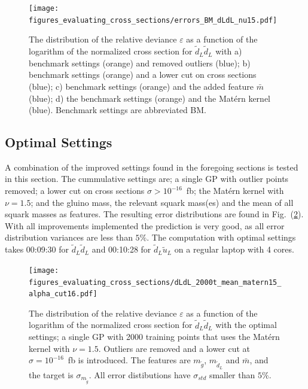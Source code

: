 \documentclass[twoside,english]{uiofysmaster}
\begin{document}
\begin{figure}
\texttt{[image: figures\_evaluating\_cross\_sections/errors\_BM\_dLdL\_nu15.pdf]}
\caption{The distribution of the relative deviance $\varepsilon$ as a function of the logarithm of the normalized cross section for $\tilde{d}_L \tilde{d}_L$ with a) benchmark settings (orange) and removed outliers (blue); b) benchmark settings (orange) and a lower cut on cross sections (blue); c) benchmark settings (orange) and the added feature $\bar{m}$ (blue); d) the benchmark settings (orange) and the Mat\'{e}rn kernel (blue). Benchmark settings are abbreviated BM.}
\label{Fig:: evaluating cross : errors BM dLdL}
\end{figure}


\subsection{Optimal Settings}

A combination of the improved settings found in the foregoing sections is tested in this section. The cummulative settings are; a single GP with outlier points removed; a lower cut on cross sections $\sigma > 10^{-16}$~fb; the Mat\'{e}rn kernel with $\nu=1.5$; and the gluino mass, the relevant squark mass(es) and the mean of all squark masses as features. The resulting error distributions are found in Fig.~(\ref{Fig:: evaluating cross : error distribution dLdL optimal}). With all improvements implemented the prediction is very good, as all error distribution variances are less than $5\%$. The computation with optimal settings takes 00:09:30 for $\tilde{d}_L \tilde{d}_L$ and 00:10:28 for $\tilde{d}_L \tilde{u}_L$ on a regular laptop with 4 cores. 

\begin{figure}
\centering
\texttt{[image: figures\_evaluating\_cross\_sections/dLdL\_2000t\_mean\_matern15\_alpha\_cut16.pdf]}
\caption{The distribution of the relative deviance $\varepsilon$ as a function of the logarithm of the normalized cross section for $\tilde{d}_L \tilde{d}_L$ with the optimal settings; a single GP with 2000 training points that uses the Mat\'{e}rn kernel with $\nu=1.5$. Outliers are removed and a lower cut at $\sigma=10^{-16}$~fb is introduced. The features are $m_{\tilde{g}}$, $m_{\tilde{d}_L}$ and $\bar{m}$, and the target is $\sigma_{m_{\tilde{g}}}$. All error distibutions have $\sigma_{std}$ smaller than $5\%$.}
\label{Fig:: evaluating cross : error distribution dLdL optimal}
\end{figure}
\end{document}
